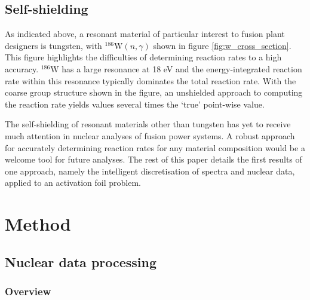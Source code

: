 \subsection{Self-shielding}

As indicated above, a resonant material of particular interest to fusion plant designers is tungsten, with $^{186}\mathrm{W}(n,\gamma)$ shown in figure \ref{fig:w_cross_section}. This figure highlights the difficulties of determining reaction rates to a high accuracy. $^{186}$W has a large resonance at 18 eV and the energy-integrated reaction rate within this resonance typically dominates the total reaction rate. With the coarse group structure shown in the figure, an unshielded approach to computing the reaction rate yields values several times the `true' point-wise value.

The self-shielding of resonant materials other than tungsten has yet to receive much attention in nuclear analyses of fusion power systems. A robust approach for accurately determining reaction rates for any material composition would be a welcome tool for future analyses. The rest of this paper details the first results of one approach, namely the intelligent discretisation of spectra and nuclear data, applied to an activation foil problem.



\section{Method}
\label{sec:method}

\subsection{Nuclear data processing}
\subsubsection{Overview}


